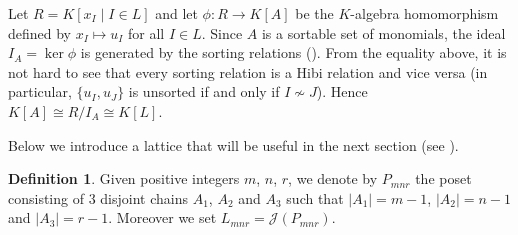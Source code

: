 \documentclass[12pt]{amsart}
\numberwithin{equation}{section}
\theoremstyle{definition}
\newtheorem{definition}[theorem]{Definition}
\begin{document}
 Let $R=K[x_I\mid I\in L]$ and let $\phi : R \to K[A]$ be
the $K$-algebra homomorphism defined by $x_I\mapsto u_I$ for all $I\in L$.
Since $A$ is a sortable set of monomials, the ideal $I_A=\ker\phi$ is generated by the sorting relations (). From the equality above, it is not hard to see that every sorting relation is a Hibi relation and vice versa (in particular, $\{u_I,u_J\}$ is unsorted if and only if $I\nsim J$). Hence $K[A]\cong R/I_A\cong K[L]$.

\bigskip



Below we introduce a lattice that will be useful in the next section (see ).
\begin{definition}
\label{def:Lmnr}
  Given positive integers $m$, $n$, $r$, we denote by $P_{mnr}$ the poset consisting of $3$ disjoint chains $A_1$, $A_2$ and $A_3$ such that $|A_1|=m-1$, $|A_2|=n-1$ and $|A_3|=r-1$.  Moreover we set $L_{mnr}=\mathcal{J}(P_{mnr})$.
\end{definition}
\end{document}
